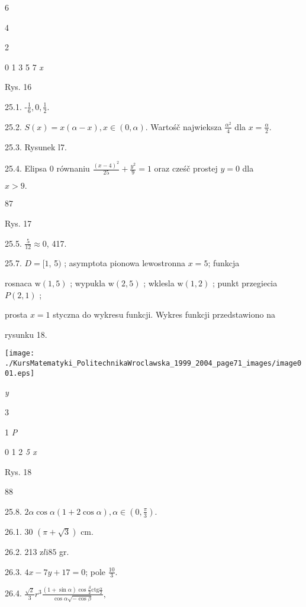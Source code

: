 \documentclass[a4paper,12pt]{article}
\begin{document}
6

4

2

0 1  3 5  7  {\it x}

Rys. 16

25.1. -$\displaystyle \frac{1}{6}, 0, \displaystyle \frac{1}{2}.$

25.2. $S(x)=x(\alpha-x), x\in(0,\alpha)$. Wartośč najwieksza $\displaystyle \frac{\alpha^{2}}{4}$ dla $x=\displaystyle \frac{\alpha}{2}.$

25.3. Rysunek l7.

25.4. Elipsa $0$ równaniu $\displaystyle \frac{(x-4)^{2}}{25}+\frac{y^{2}}{9}=1$ oraz cześč prostej $y=0$ dla

$x>9.$





87

Rys. 17

25.5. $\displaystyle \frac{5}{12}\approx 0$, 417.

25.7. $D = [1$, 5$)$ ; asymptota pionowa lewostronna $x = 5$; funkcja

rosnaca $\mathrm{w}(1,5)$ ; wypukla $\mathrm{w}(2,5)$ ; wklesla $\mathrm{w}(1,2)$ ; punkt przegiecia $P(2,1)$ ;

prosta $x=1$ styczna do wykresu funkcji. Wykres funkcji przedstawiono na

rysunku 18.
\begin{center}
\texttt{[image: ./KursMatematyki\_PolitechnikaWroclawska\_1999\_2004\_page71\_images/image001.eps]}
\end{center}
{\it y}

3

1  {\it P}

0 1  2  {\it 5 x}

Rys. 18





88

25.8. $2\alpha\cos\alpha(1+2\cos\alpha), \alpha\in (0,\displaystyle \frac{\pi}{3}).$

26.1. 30 $(\pi+\sqrt{3})$ cm.

26.2. 213 $\mathrm{z}l\mathrm{i}85$ gr.

26.3. $4x-7y+17=0$; pole $\displaystyle \frac{10}{3}.$

26.4. $\displaystyle \frac{\sqrt{2}}{3}r^{3}\frac{(1+\sin\alpha)\cos\frac{\beta}{2}\mathrm{c}\mathrm{t}\mathrm{g}\frac{\alpha}{2}}{\cos\alpha\sqrt{-\cos\beta}},$
\end{document}
